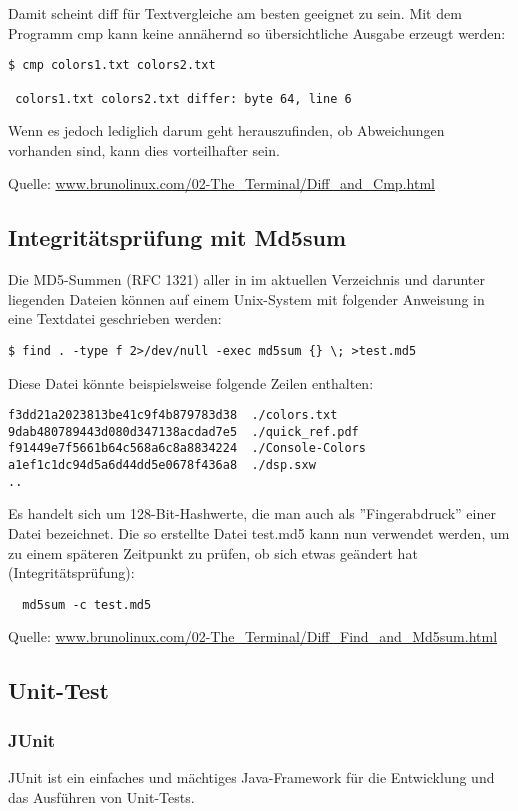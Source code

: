 \newslide
Damit scheint diff für Textvergleiche am besten geeignet zu sein.
Mit dem Programm cmp kann keine annähernd so übersichtliche
Ausgabe erzeugt werden:
\begin{lstlisting}
$ cmp colors1.txt colors2.txt

 colors1.txt colors2.txt differ: byte 64, line 6
\end{lstlisting}
Wenn es jedoch lediglich darum geht herauszufinden, ob
Abweichungen vorhanden sind, kann dies vorteilhafter sein.

Quelle:
\href{http://www.brunolinux.com/02-The_Terminal/Diff_and_Cmp.html}
{www.brunolinux.com/02-The\_Terminal/Diff\_and\_Cmp.html}
\newslide
\subsection{Integritätsprüfung mit Md5sum}
Die MD5-Summen (RFC 1321)
aller in im aktuellen Verzeichnis und darunter
liegenden Dateien können auf einem Unix-System mit folgender Anweisung
in eine Textdatei geschrieben werden:
\begin{lstlisting}
$ find . -type f 2>/dev/null -exec md5sum {} \; >test.md5
\end{lstlisting}
Diese Datei könnte beispielsweise folgende Zeilen enthalten:
\begin{lstlisting}
f3dd21a2023813be41c9f4b879783d38  ./colors.txt
9dab480789443d080d347138acdad7e5  ./quick_ref.pdf
f91449e7f5661b64c568a6c8a8834224  ./Console-Colors
a1ef1c1dc94d5a6d44dd5e0678f436a8  ./dsp.sxw
..
\end{lstlisting}
\newslide
Es handelt sich um 128-Bit-Hashwerte, die man auch als
''Fingerabdruck'' einer Datei bezeichnet.
Die so erstellte Datei test.md5 kann nun verwendet werden,
um zu einem späteren Zeitpunkt
zu prüfen, ob sich etwas geändert hat (Integritätsprüfung):
\begin{lstlisting}
  md5sum -c test.md5
\end{lstlisting}
Quelle: \href{http://www.brunolinux.com/02-The_Terminal/Diff_Find_and_Md5sum.html}
  {www.brunolinux.com/02-The\_Terminal/Diff\_Find\_and\_Md5sum.html}
%
\newslide
\subsection{Unit-Test}
\subsubsection{JUnit}
JUnit ist ein einfaches und mächtiges Java-Framework für die
Entwicklung und das Ausführen von Unit-Tests.

